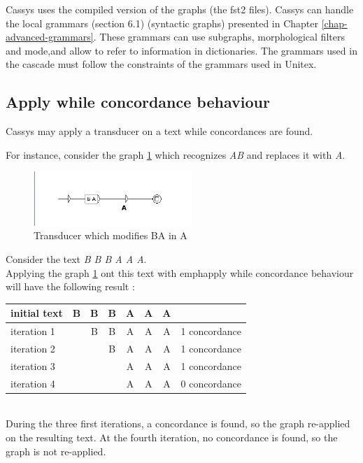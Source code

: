 Cassys uses the compiled version of the graphs (the fst2 files).
Cassys can handle the local grammars (section 6.1) (syntactic graphs) presented in Chapter \ref{chap-advanced-grammars}. These grammars can use subgraphs, 
morphological filters and mode,and allow to refer to information in dictionaries. 
The grammars used in the cascade must follow the constraints of the grammars used in Unitex.


\subsection{Apply while concordance behaviour}
\label{sub:AppWhiCon}

Cassys may apply a transducer on a text while concordances are found. 

For
instance, consider the graph \ref{fig:AB->A} which recognizes \emph{AB} and
replaces it with \emph{A}. 

\begin{figure}[!htb]
  \centering
  \includegraphics[width=6cm]{resources/img/AB->A.png}
  \caption{Transducer which modifies BA in A}
  \label{fig:AB->A}
\end{figure}

Consider the text \emph{B B B A A A}. \\

Applying the graph \ref{fig:AB->A} ont this text with emph{apply while
concordance behaviour} will have the following result :\\

\begin{tabular}{|l|cccccc|r|}
\hline
initial text  &B&B&B&A&A&A&\\
\hline
iteration 1 & &B&B&A&A&A& 1 concordance\\
iteration 2 & & &B&A&A&A& 1 concordance\\
iteration 3 & & & &A&A&A& 1 concordance\\
iteration 4 & & & &A&A&A& 0 concordance\\
\hline
\end{tabular} \\

During the three first iterations, a concordance is found, so the graph
re-applied on the resulting text. At the fourth iteration, no concordance is
found, so the graph is not re-applied.

